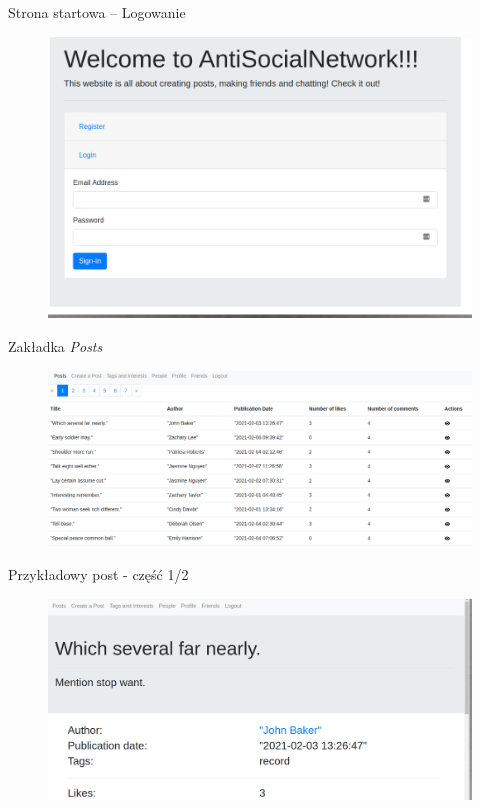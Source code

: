 \documentclass[handout]{beamer}
\begin{document}
        \begin{frame}[fragile]{Strona startowa -- Logowanie}
            \begin{figure}
                \centering
                \includegraphics[width=\linewidth]{welcome_page_login.png}
            \end{figure}
        \end{frame}
        
        \begin{frame}[fragile]{Zakładka \textit{Posts}}
            \begin{figure}
                \centering
                \includegraphics[width=\linewidth]{posts.png}
            \end{figure}
        \end{frame}
        
        \begin{frame}{Przykładowy post - część 1/2}
            \begin{figure}
                \centering
                \includegraphics[width=\linewidth]{example_post_part_1.png}
            \end{figure}
        \end{frame}
        
\end{document}
